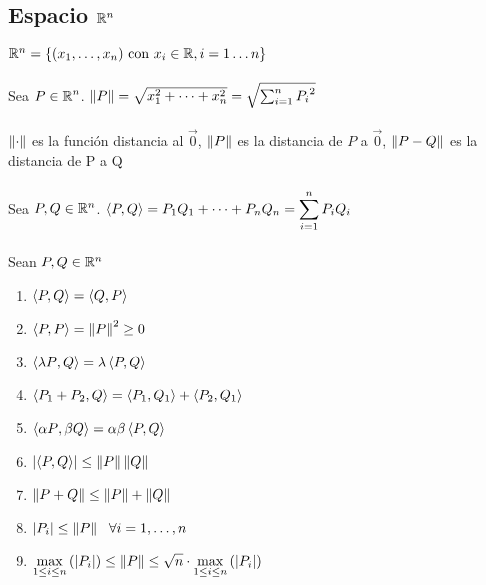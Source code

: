 \documentclass[a4paper,10pt]{article}
\begin{document}
\subsection{Espacio $\mathbb{R}^{n}$}
 $\mathbb{R}^{n} = \left\lbrace (x_1,\dots,x_n) \mbox{ con } x_i \in \mathbb{R},i=1 \dots n \right\rbrace$
\\ \\
 Sea $\displaystyle P \in \mathbb{R}^{n}$. $\left\lVert P\right\rVert = \sqrt{x_1^2+\dots+x_n^2} = \sqrt{\sum_{i=1}^{n} {P_i}^2}$
\\ \\
\observacion $\left\lVert\cdot\right\rVert$ es la función distancia al $\vec{0}$, $\left\lVert P\right\rVert$ es la distancia de $P$ a $\vec{0}$, $\left\lVert P-Q\right\rVert$ es la distancia de P a Q
\\ \\
 Sea $P,Q \in \mathbb{R}^{n}$. $\left\langle {P},{Q} \right\rangle = P_1Q_1 + \dots + P_nQ_n = \displaystyle\sum_{i = 1}^{n} P_iQ_i$
\\ \\
\propiedad Sean $P,Q \in \mathbb{R}^{n}$
\begin{enumerate}
	\item $\left\langle {P},{Q} \right\rangle = \left\langle {Q},{P} \right\rangle$
	\item $\left\langle {P},{P} \right\rangle = \left\lVert P\right\rVert^2 \geq 0$
	\item $\left\langle {\lambda P},{Q} \right\rangle = \lambda\left\langle {P},{Q} \right\rangle$
	\item $\left\langle {P_1 + P_2},{Q} \right\rangle = \left\langle {P_1},{Q_1} \right\rangle + \left\langle {P_2},{Q_1} \right\rangle$
	\item $\left\langle {\alpha P},{\beta Q} \right\rangle = \alpha\beta\left\langle {P},{Q} \right\rangle$
	\item $\left\lvert\left\langle {P},{Q} \right\rangle\right\rvert \leq \left\lVert P\right\rVert\left\lVert Q\right\rVert$
	\item $\left\lVert P+Q\right\rVert \leq \left\lVert P\right\rVert + \left\lVert Q\right\rVert$
	\item $\left\lvert P_i\right\rvert \leq \left\lVert P\right\rVert \ \ \forall i=1,\dots,n$
	\item $\displaystyle \max_{1 \leq i \leq n} \left( \left\lvert P_i\right\rvert \right) \leq \left\lVert P\right\rVert \leq \sqrt{n} \cdot \max_{1 \leq i \leq n} \left( \left\lvert P_i\right\rvert \right)$
\end{enumerate}
\ifversionlarga
\end{document}
